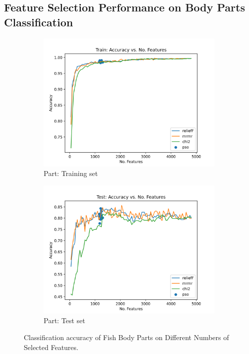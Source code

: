 \documentclass[runningheads]{llncs}
\begin{document}
\subsection{Feature Selection Performance on Body Parts Classification}

\begin{figure}[t]
  \centering
  \begin{subfigure}[b]{.45\linewidth}
    \includegraphics[width=\linewidth]{accuracy-features-part-train.png}
    \caption{Part: Training set}\label{fig:fs-per-k-part-part-train}
  \end{subfigure}
  \begin{subfigure}[b]{.45\linewidth}
    \includegraphics[width=\linewidth]{accuracy-features-part-test.png}
    \caption{Part: Test set}\label{fig:fs-per-k-part-part-test}
  \end{subfigure}
  \caption[Two numerical solutions]{
    Classification accuracy of Fish Body Parts on Different Numbers of Selected Features.
  }
  \label{fig:fs-per-k-part}
\end{figure}
\end{document}
